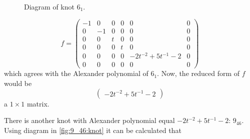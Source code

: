 \begin{example}
\begin{figure}[h]
\begin{tikzpicture}[bgnd/.style={circle, fill=white, draw=white}]
  \end{tikzpicture}
  \caption{\label{fig:6_1:knot}Diagram of knot $6_1$.}
\end{figure}
$$f=\begin{pmatrix}
  -1 & 0 & 0 & 0 & 0 & 0 \\ 
  0 & -1 & 0 & 0 & 0 & 0 \\ 
  0 & 0 & t & 0 & 0 & 0 \\ 
  0 & 0 & 0 & t & 0 & 0 \\ 
  0 & 0 & 0 & 0 & -2t^{-2}+5t^{-1}-2 & 0 \\ 
  0 & 0 & 0 & 0 & 0 & 0 
\end{pmatrix}$$
which agrees with the Alexander polynomial of $6_1$. Now, the reduced form of $f$ would be 
$$
\begin{pmatrix}
  -2t^{-2}+5t^{-1}-2
\end{pmatrix}
$$
a $1\times 1$ matrix.

There is another knot with Alexander polynomial equal $-2t^{-2}+5t^{-1}-2$: $9_{46}$. Using diagram in \cref{fig:9_46:knot} it can be calculated that  
\begin{figure}[h]\centering
\end{figure}
\end{example}
